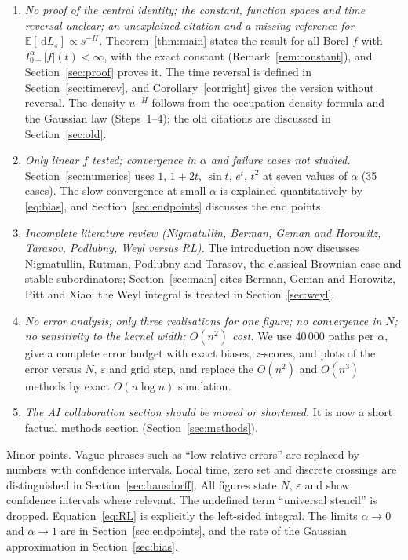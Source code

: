 \documentclass[11pt]{article}
\theoremstyle{remark}
\theoremstyle{definition}
\newcommand{\E}{\mathbb{E}}
\newcommand{\dd}{\,\mathrm{d}}
\newcommand{\Ia}{I^{\alpha}_{0+}}
\begin{document}
\begin{enumerate}
\item \emph{No proof of the central identity; the constant, function spaces and time reversal unclear; an unexplained citation and a missing reference for $\E[\dd L_s]\propto s^{-H}$.} Theorem~\ref{thm:main} states the result for all Borel $f$ with $\Ia|f|(t)<\infty$, with the exact constant (Remark~\ref{rem:constant}), and Section~\ref{sec:proof} proves it. The time reversal is defined in Section~\ref{sec:timerev}, and Corollary~\ref{cor:right} gives the version without reversal. The density $u^{-H}$ follows from the occupation density formula and the Gaussian law (Steps~1--4); the old citations are discussed in Section~\ref{sec:old}.
\item \emph{Only linear $f$ tested; convergence in $\alpha$ and failure cases not studied.} Section~\ref{sec:numerics} uses $1$, $1+2t$, $\sin t$, $e^t$, $t^2$ at seven values of $\alpha$ (35 cases). The slow convergence at small $\alpha$ is explained quantitatively by \eqref{eq:bias}, and Section~\ref{sec:endpoints} discusses the end points.
\item \emph{Incomplete literature review (Nigmatullin, Berman, Geman and Horowitz, Tarasov, Podlubny, Weyl versus RL).} The introduction now discusses Nigmatullin, Rutman, Podlubny and Tarasov, the classical Brownian case and stable subordinators; Section~\ref{sec:main} cites Berman, Geman and Horowitz, Pitt and Xiao; the Weyl integral is treated in Section~\ref{sec:weyl}.
\item \emph{No error analysis; only three realisations for one figure; no convergence in $N$; no sensitivity to the kernel width; $O(n^2)$ cost.} We use 40\,000 paths per $\alpha$, give a complete error budget with exact biases, $z$-scores, and plots of the error versus $N$, $\varepsilon$ and grid step, and replace the $O(n^2)$ and $O(n^3)$ methods by exact $O(n\log n)$ simulation.
\item \emph{The AI collaboration section should be moved or shortened.} It is now a short factual methods section (Section~\ref{sec:methods}).
\end{enumerate}
Minor points. Vague phrases such as ``low relative errors'' are replaced by numbers with confidence intervals. Local time, zero set and discrete crossings are distinguished in Section~\ref{sec:hausdorff}. All figures state $N$, $\varepsilon$ and show confidence intervals where relevant. The undefined term ``universal stencil'' is dropped. Equation~\eqref{eq:RL} is explicitly the left-sided integral. The limits $\alpha\to0$ and $\alpha\to1$ are in Section~\ref{sec:endpoints}, and the rate of the Gaussian approximation in Section~\ref{sec:bias}.
\end{document}
